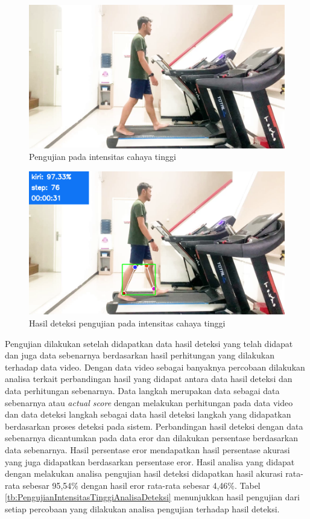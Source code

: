 \begin{figure}[H]
  \centering
  \includegraphics[scale=0.5]{gambar/cahaya_tinggi.png}
  \caption{Pengujian pada intensitas cahaya tinggi}
  \label{fig:PengujianIntensitasTinggi}
\end{figure}

\begin{figure}[H]
  \centering
  \includegraphics[scale=0.5]{gambar/cahaya_tinggi2.png}
  \caption{Hasil deteksi pengujian pada intensitas cahaya tinggi}
  \label{fig:PengujianIntensitasTinggi2}
\end{figure}

Pengujian dilakukan setelah didapatkan data hasil deteksi yang telah didapat dan juga data sebenarnya berdasarkan hasil perhitungan yang dilakukan terhadap data video. Dengan data video sebagai banyaknya percobaan dilakukan analisa terkait perbandingan hasil yang didapat antara data hasil deteksi dan data perhitungan sebenarnya. Data langkah merupakan data sebagai data sebenarnya atau \emph{actual score} dengan melakukan perhitungan pada data video dan data deteksi langkah sebagai data hasil deteksi langkah yang didapatkan berdasarkan proses deteksi pada sistem. Perbandingan hasil deteksi dengan data sebenarnya dicantumkan pada data eror dan dilakukan persentase berdasarkan data sebenarnya. Hasil persentase eror mendapatkan hasil persentase akurasi yang juga didapatkan berdasarkan persentase eror. Hasil analisa yang didapat dengan melakukan analisa pengujian hasil deteksi didapatkan hasil akurasi rata-rata sebesar 95,54\% dengan hasil eror rata-rata sebesar 4,46\%. Tabel \ref{tb:PengujianIntensitasTinggiAnalisaDeteksi} menunjukkan hasil pengujian dari setiap percobaan yang dilakukan analisa pengujian terhadap hasil deteksi.

